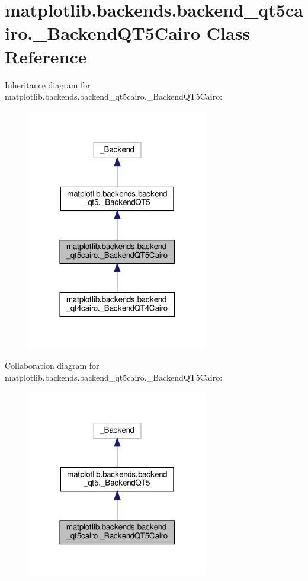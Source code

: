 \hypertarget{classmatplotlib_1_1backends_1_1backend__qt5cairo_1_1__BackendQT5Cairo}{}\section{matplotlib.\+backends.\+backend\+\_\+qt5cairo.\+\_\+\+Backend\+Q\+T5\+Cairo Class Reference}
\label{classmatplotlib_1_1backends_1_1backend__qt5cairo_1_1__BackendQT5Cairo}


Inheritance diagram for matplotlib.\+backends.\+backend\+\_\+qt5cairo.\+\_\+\+Backend\+Q\+T5\+Cairo\+:
\nopagebreak
\begin{figure}[H]
\begin{center}
\leavevmode
\includegraphics[width=225pt]{classmatplotlib_1_1backends_1_1backend__qt5cairo_1_1__BackendQT5Cairo__inherit__graph}
\end{center}
\end{figure}


Collaboration diagram for matplotlib.\+backends.\+backend\+\_\+qt5cairo.\+\_\+\+Backend\+Q\+T5\+Cairo\+:
\nopagebreak
\begin{figure}[H]
\begin{center}
\leavevmode
\includegraphics[width=225pt]{classmatplotlib_1_1backends_1_1backend__qt5cairo_1_1__BackendQT5Cairo__coll__graph}
\end{center}
\end{figure}
